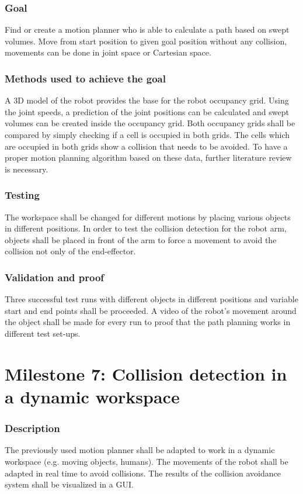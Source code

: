 \subsubsection{Goal}
Find or create a motion planner who is able to calculate a path based on swept volumes. 
Move from start position to given goal position without any collision, movements can be done in joint space or Cartesian space.
\subsubsection{Methods used to achieve the goal}
A 3D model of the robot provides the base for the robot occupancy grid. Using the joint speeds, a prediction of the joint positions can be calculated and swept volumes can be created inside the occupancy grid. Both occupancy grids shall be compared by simply checking if a cell is occupied in both grids. The cells which are occupied in both grids show a collision that needs to be avoided.
To have a proper motion planning algorithm based on these data, further literature review is necessary.

\subsubsection{Testing}
The workspace shall be changed for different motions by placing various objects in different positions. In order to test the collision detection for the robot arm, objects shall be placed in front of the arm to force a movement to avoid the collision not only of the end-effector.

\subsubsection{Validation and proof}
Three successful test runs with different objects in different positions and variable start and end points shall be proceeded.
A video of the robot's movement around the object shall be made for every run to proof that the path planning works in different test set-ups.

\section{Milestone 7: Collision detection in a dynamic workspace}
\label{chap:mile7}
\subsubsection{Description}
The previously used motion planner shall be adapted to work in a dynamic workspace (e.g. moving objects, humans). The movements of the robot shall be adapted in real time to avoid collisions. The results of the collision avoidance system shall be visualized in a GUI. 


